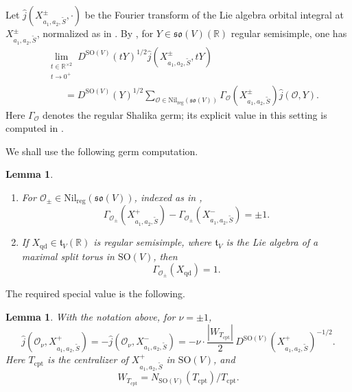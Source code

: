\documentclass[12pt]{amsart}
\numberwithin{equation}{subsection}
\newcommand{\BR}{{\mathbb {R}}}
\newcommand{\CO}{{\mathcal {O}}}
\newcommand{\Fo}{{\mathfrak {o}}}
\newcommand{\Fs}{{\mathfrak {s}}}
\newcommand{\Ft}{{\mathfrak {t}}}
\newcommand{\reg}{{\mathrm{reg}}}
\newcommand{\SO}{{\mathrm{SO}}}
\def\nil{\mathrm{Nil}}
\def\qd{\mathrm{qd}}
\def\cpt{\mathrm{cpt}}
\def\SO{\mathrm{SO}}
\newtheorem{lem}[thm]{Lemma}
\begin{document}
Let $\widehat{j}(X^\pm_{a_1,a_2,\widetilde S},\cdot)$ be the Fourier transform
of the Lie algebra orbital integral at
$X^\pm_{a_1,a_2,\widetilde S}$, normalized as in
\cite[\S 1.9]{beuzart2015local}. By \cite[Lem.~4.3.1]{beuzart2015local},
for $Y\in \Fs\Fo(V)(\BR)$ regular semisimple, one has
\begin{align}\label{eq:limitforwhjXpm:1}
&\lim_{\substack{t\in \BR^{\times 2}\\ t\to 0^+}}
D^{\SO(V)}(tY)^{1/2}
\widehat{j}(X^\pm_{a_1,a_2,\widetilde S},tY)
\nonumber\\
&\qquad =
D^{\SO(V)}(Y)^{1/2}
\sum_{\CO\in \nil_\reg(\Fs\Fo(V))}
\Gamma_\CO(X^\pm_{a_1,a_2,\widetilde S})
\widehat{j}(\CO,Y).
\end{align}
Here $\Gamma_\CO$ denotes the regular Shalika germ; its explicit value in this
setting is computed in \cite[Thm.~4.2.0.1]{thesis_zhilin}.

We shall use the following germ computation.

\begin{lem}\label{lem:germformula}
\begin{enumerate}
\item For $\CO_\pm\in \nil_\reg(\Fs\Fo(V))$, indexed as in
\cite[\S 6.1.2]{thesis_zhilin},
\[
\Gamma_{\CO_\pm}(X^+_{a_1,a_2,\widetilde S})
-
\Gamma_{\CO_\pm}(X^-_{a_1,a_2,\widetilde S})
=
\pm 1.
\]

\item If $X_\qd\in \Ft_V(\BR)$ is regular semisimple, where $\Ft_V$ is the Lie
algebra of a maximal split torus in $\SO(V)$, then
\[
\Gamma_{\CO_\pm}(X_\qd)=1.
\]
\end{enumerate}
\end{lem}

The required special value is the following.

\begin{lem}\label{lem:thecalculationofj}
With the notation above, for $\nu=\pm 1$,
\[
\widehat{j}(\CO_\nu,X^+_{a_1,a_2,\widetilde S})
=
-\widehat{j}(\CO_\nu,X^-_{a_1,a_2,\widetilde S})
=
-\nu\cdot
\frac{|W_{T_\cpt}|}{2}\,
D^{\SO(V)}(X^+_{a_1,a_2,\widetilde S})^{-1/2}.
\]
Here $T_\cpt$ is the centralizer of $X^+_{a_1,a_2,\widetilde S}$ in
$\SO(V)$, and
\[
W_{T_\cpt}=N_{\SO(V)}(T_\cpt)/T_\cpt .
\]
\end{lem}
\end{document}
